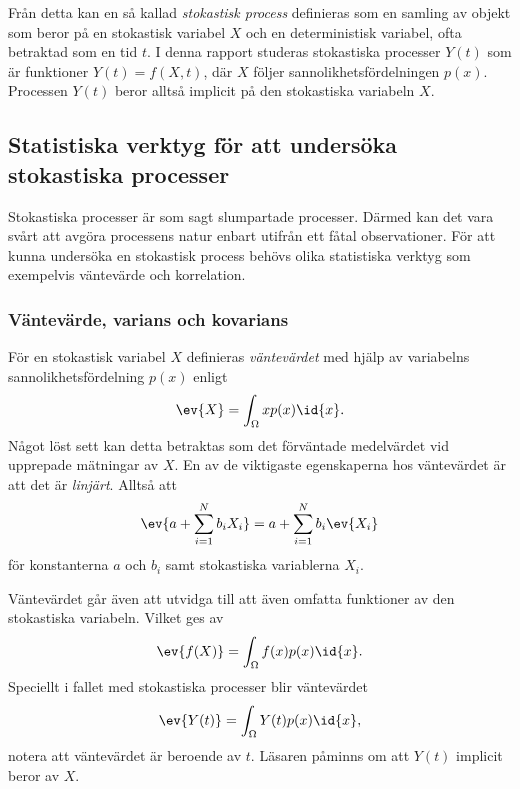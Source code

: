 Från detta kan en så kallad \emph{stokastisk process} definieras som en samling av objekt som beror på en stokastisk variabel $X$ och en deterministisk variabel, ofta betraktad som en tid\footnotemark{} $t$.
I denna rapport studeras stokastiska processer $Y(t)$ som är funktioner $Y(t) = f(X,t)$, där $X$ följer sannolikhetsfördelningen $p(x)$. Processen $Y(t)$ beror alltså implicit på den stokastiska variabeln $X$.

\subsection{Statistiska verktyg för att undersöka stokastiska processer}
Stokastiska processer är som sagt slumpartade processer. Därmed kan det vara svårt att avgöra processens natur enbart utifrån ett fåtal observationer. För att kunna undersöka en stokastisk process behövs olika statistiska verktyg som exempelvis väntevärde och korrelation.

\subsubsection{Väntevärde, varians och kovarians}
För en stokastisk variabel $X$ definieras \emph{väntevärdet} med hjälp av variabelns sannolikhetsfördelning $p(x)$ enligt
\begin{equation}\label{eq:EV}
    \ev{X} = \int_{\Omega} x p(x) \id{x}.
\end{equation}
Något löst sett kan detta betraktas som det förväntade medelvärdet vid upprepade mätningar av $X$. En av de viktigaste egenskaperna hos väntevärdet är att det är \emph{linjärt}. Alltså att~\cite{Rice_matstat2006}
\begin{equation}\label{eq:EV_linkomb}
\ev{a+\sum_{i=1}^N b_i X_i} = a+\sum_{i=1}^N b_i \ev{X_i}
\end{equation}
för konstanterna $a$ och $b_i$ samt stokastiska variablerna $X_i$. 

Väntevärdet går även att utvidga till att även omfatta funktioner av
den stokastiska variabeln. Vilket ges av~\cite{Rice_matstat2006}
\begin{equation}\label{eq:EV_f}
    \ev{f(X)} = \int_{\Omega} f(x) p(x) \id{x}.
\end{equation}
Speciellt i fallet med stokastiska processer blir väntevärdet 
\begin{equation}\label{eq:EV_process}
    \ev{Y(t)} = \int_{\Omega} Y(t)p(x) \id{x},
\end{equation}
notera att väntevärdet är beroende av $t$. Läsaren påminns om att $Y(t)$ implicit beror av $X$.

